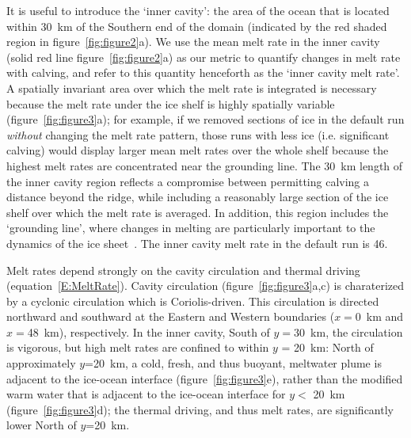 \documentclass[draft]{agujournal2019}
\begin{document}
It is useful to introduce the `inner cavity': the area of the ocean that is located within 30~km of the Southern end of the domain (indicated by the red shaded region in figure~\ref{fig:figure2}a). We use the mean melt rate in the inner cavity (solid red line figure~\ref{fig:figure2}a) as our metric to quantify changes in melt rate with calving, and refer to this quantity henceforth as the `inner cavity melt rate'. A spatially invariant area over which the melt rate is integrated is necessary because the melt rate under the ice shelf is highly spatially variable (figure~\ref{fig:figure3}a); for example, if we removed sections of ice in the default run \textit{without} changing the melt rate pattern, those runs with less ice (i.e. significant calving) would display larger mean melt rates over the whole shelf because the highest melt rates are concentrated near the grounding line. The 30~km length of the inner cavity region reflects a compromise between permitting calving a distance beyond the ridge, while including a reasonably large section of the ice shelf over which the melt rate is averaged. In addition, this region includes the `grounding line', where changes in melting are particularly important to the dynamics of the ice sheet~\cite{Seroussi2014Cryo, Athern2017GRL}. The inner cavity melt rate in the default run is 46\mpryr.

Melt rates depend strongly on the cavity circulation and thermal driving (equation~\eqref{E:MeltRate}). Cavity circulation (figure~\ref{fig:figure3}a,c) is charaterized by a cyclonic circulation which is Coriolis-driven. This circulation is directed northward and southward at the Eastern and Western boundaries ($x=$0~km and $x=$48~km), respectively. In the inner cavity, South of $y = 30$~km, the circulation is vigorous, but high melt rates are confined to within $y$ = 20~km: North of approximately $y$=20~km, a cold, fresh, and thus buoyant, meltwater plume  is adjacent to the ice-ocean interface (figure~\ref{fig:figure3}e), rather than the modified warm water that is adjacent to the ice-ocean interface for $y < $ 20~km  (figure~\ref{fig:figure3}d); the thermal driving, and thus melt rates, are significantly lower North of $y$=20~km.
\end{document}
